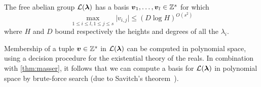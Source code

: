 \begin{theorem}[Masser]
\label{thm:masser}
The free abelian group ${\mathcal{L}}(\boldsymbol{\lambda})$ has a basis $\boldsymbol{v}_1, \ldots, \boldsymbol{v}_{l} \in \mathbb{Z}^{s}$ for which
\[ \max\limits_{1\leq i\leq l,1\leq j\leq s} \lvert v_{i,j} \rvert \leq (D\log H)^{O(s^2)} \]
where $H$ and $D$ bound respectively the heights and degrees of all the $\lambda_{i}$.
\end{theorem}
Membership of a tuple $\boldsymbol{v}\in \mathbb{Z}^{s}$ in ${\mathcal{L}}(\boldsymbol{\lambda})$ can be computed in polynomial space, using a decision procedure for the existential theory of the reals. In combination with \cref{thm:masser}, it follows that we can compute a basis for ${\mathcal{L}}(\boldsymbol{\lambda})$ in polynomial space by brute-force search (due to Savitch's theorem~\cite{Savitch}).
